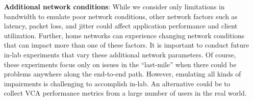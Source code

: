 \textbf{Additional network conditions}: While we consider only limitations in bandwidth to emulate poor network conditions, other network factors such as latency, packet loss, and jitter could affect application performance and client utilization. Further, home networks can experience changing network conditions that can impact more than one of these factors. It is important to conduct future in-lab experiments that vary these additional network parameters. Of course, these experiments focus only on issues in the ``last-mile'' when there could be problems anywhere along the end-to-end path. However, emulating all kinds of impairments is challenging to accomplish in-lab. An alternative could be to collect VCA performance metrics from a large number of users in the real world. 